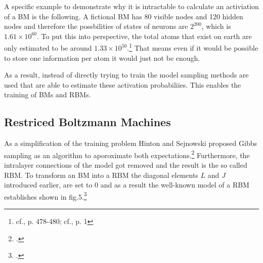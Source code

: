 A specific example to demonstrate why it is intractable to calculate an activiation of a \ac{BM} is the following. A fictional \ac{BM} has 80 visible nodes and 120 hidden nodes and therefore the possbilities of states of neurons are \( 2^{200} \), which is \( 1.61 \times 10^{60}\). 
To put this into perspective, the total atoms that exist on earth are only estimated to be around \( 1.33 \times 10^{50}\).\footnote{cf.\cite{helmenstineHowManyAtoms2022}, p. 478-480; cf.\cite{schlammingerCoolWayMeasure2014}, p. 1}
That means even if it would be possible to store one information per atom it would just not be enough. 

As a result, instead of directly trying to train the model sampling methods are used that are able to estimate these activation probabiliies.
This enables the training of \ac{BM}s and \ac{RBM}s.
\subsection{Restriced Boltzmann Machines}

As a simplification of the training problem Hinton and Sejnowski proposed Gibbs sampling as an algorithm to aporoximate both expectations.\footcite[cf.][158-165]{ackleyLearningAlgorithmBoltzmann1985}
Furthermore, the intralayer connections of the model got removed and the result is the so called \ac{RBM}.
To transform an \ac{BM} into a \ac{RBM} the diagonal elements \( L \) and \( J \)  introduced earlier, are set to 0 and as a result the well-known model of a \ac{RBM} establishes shown in fig.5.\footcite[cf.][449]{salakhutdinovDeepBoltzmannMachines2009}

